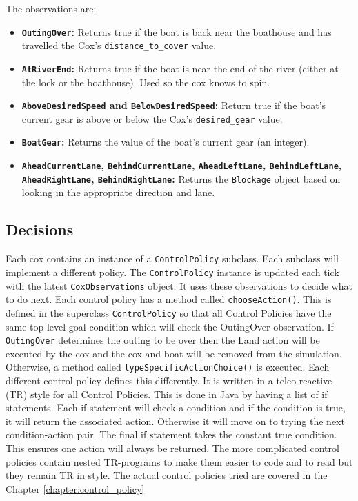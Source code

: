 The observations are:
  \begin{itemize}
    \item{\textbf{\texttt{OutingOver}:}} Returns true if the boat is back near the boathouse and has travelled the Cox's \texttt{distance\_to\_cover} value.
    \item{\textbf{\texttt{AtRiverEnd}:}} Returns true if the boat is near the end of the river (either at the lock or the boathouse). Used so the cox knows to spin.
    \item{\textbf{\texttt{AboveDesiredSpeed} and \texttt{BelowDesiredSpeed}:}} Return true if the boat's current gear is above or below the Cox's \texttt{desired\_gear} value. 
    \item{\textbf{\texttt{BoatGear}:}} Returns the value of the boat's current gear (an integer).
    \item{\textbf{\texttt{AheadCurrentLane}, \texttt{BehindCurrentLane}, \texttt{AheadLeftLane}, \texttt{BehindLeftLane}, \texttt{AheadRightLane}, \texttt{BehindRightLane}:}} Returns the \texttt{Blockage} object based on looking in the appropriate direction and lane.
  \end{itemize}
  
\subsection{Decisions}
  Each cox contains an instance of a \texttt{ControlPolicy} subclass. Each subclass will implement a different policy. The \texttt{ControlPolicy} instance is updated each tick with the latest \texttt{CoxObservations} object. It uses these observations to decide what to do next.  Each control policy has a method called \texttt{chooseAction()}. This is defined in the superclass \texttt{ControlPolicy} so that all Control Policies have the same top-level goal condition which will check the OutingOver observation. If \texttt{OutingOver} determines the outing to be over then the Land action will be executed by the cox and the cox and boat will be removed from the simulation. Otherwise, a method called \texttt{typeSpecificActionChoice()} is executed. Each different control policy defines this differently. It is written in a teleo-reactive (TR) style for all Control Policies. This is done in Java by having a list of if statements. Each if statement will check a condition and if the condition is true, it will return the associated action. Otherwise it will move on to trying the next condition-action pair. The final if statement takes the constant true condition. This ensures one action will always be returned. The more complicated control policies contain nested TR-programs to make them easier to code and to read but they remain TR in style. The actual control policies tried are covered in the Chapter \ref{chapter:control_policy}
  
